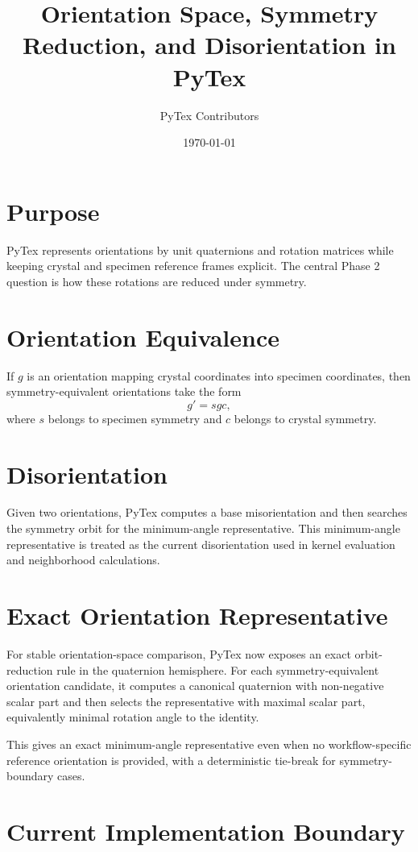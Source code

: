 \documentclass[11pt]{article}
\title{Orientation Space, Symmetry Reduction, and Disorientation in PyTex}
\author{PyTex Contributors}
\date{\today}
\begin{document}
\maketitle

\section{Purpose}

PyTex represents orientations by unit quaternions and rotation matrices while keeping crystal and specimen reference frames explicit. The central Phase 2 question is how these rotations are reduced under symmetry.

\section{Orientation Equivalence}

If $g$ is an orientation mapping crystal coordinates into specimen coordinates, then symmetry-equivalent orientations take the form
\[
  g' = s g c,
\]
where $s$ belongs to specimen symmetry and $c$ belongs to crystal symmetry.

\section{Disorientation}

Given two orientations, PyTex computes a base misorientation and then searches the symmetry orbit for the minimum-angle representative. This minimum-angle representative is treated as the current disorientation used in kernel evaluation and neighborhood calculations.

\section{Exact Orientation Representative}

For stable orientation-space comparison, PyTex now exposes an exact orbit-reduction rule in the quaternion hemisphere. For each symmetry-equivalent orientation candidate, it computes a canonical quaternion with non-negative scalar part and then selects the representative with maximal scalar part, equivalently minimal rotation angle to the identity.

This gives an exact minimum-angle representative even when no workflow-specific reference orientation is provided, with a deterministic tie-break for symmetry-boundary cases.

\section{Current Implementation Boundary}
\end{document}
